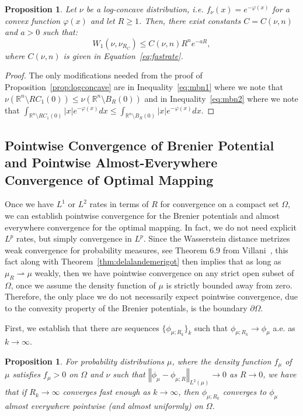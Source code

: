 \documentclass{amsart}
\theoremstyle{lemma}
\newtheorem{proposition}[theorem]{Proposition}
\theoremstyle{remark}
\begin{document}
\begin{proposition}
Let $\nu$ be a log-concave distribution, i.e. $f_{\nu}(x) = e^{-\varphi(x)}$ for a convex function $\varphi(x)$ and let $R \geq 1$. Then, there exist constants $C = C(\nu, n)$ and $a>0$ such that:
\begin{equation}
W_1(\nu, \nu_{R_{C}}) \leq C(\nu, n) R^n e^{-aR},
\end{equation}
where $C(\nu, n)$ is given in Equation~\eqref{eq:fastrate}.
\end{proposition}
\begin{proof}
The only modifications needed from the proof of Proposition~\ref{prop:logconcave} are in Inequality~\eqref{eq:mbn1} where we note that $\nu(\mathbb{R}^n \setminus RC_1(0)) \leq \nu(\mathbb{R}^n \setminus B_{R}(0))$ and in Inequality~\eqref{eq:mbn2} where we note that $\int_{\mathbb{R}^n \setminus RC_1(0)} \vert x \vert e^{-\varphi(x)}dx \leq \int_{\mathbb{R}^n \setminus B_{R}(0)} \vert x \vert e^{-\varphi(x)}dx$. 
\end{proof}

\subsection{Pointwise Convergence of Brenier Potential and Pointwise Almost-Everywhere Convergence of Optimal Mapping}\label{sec:pointwise}

Once we have $L^1$ or $L^2$ rates in terms of $R$ for convergence on a compact set $\Omega$, we can establish pointwise convergence for the Brenier potentials and almost everywhere convergence for the optimal mapping. In fact, we do not need explicit $L^p$ rates, but simply convergence in $L^p$. Since the Wasserstein distance metrizes weak convergence for probability measures, see Theorem 6.9 from Villani~\cite{villani2}, this fact along with Theorem~\ref{thm:delalandemerigot} then implies that as long as $\mu_{R} \rightharpoonup \mu$ weakly, then we have pointwise convergence on any strict open subset of $\Omega$, once we assume the density function of $\mu$ is strictly bounded away from zero. Therefore, the only place we do not necessarily expect pointwise convergence, due to the convexity property of the Brenier potentials, is the boundary $\partial \Omega$.

First, we establish that there are sequences $\{\phi_{\mu;R_{k}} \}_{k}$ such that $\phi_{\mu;R_{k}} \rightarrow \phi_{\mu}$ a.e. as $k \rightarrow \infty$.

\begin{proposition}\label{prop:almosteverywhere}
For probability distributions $\mu$, where the density function $f_{\mu}$ of $\mu$ satisfies $f_{\mu}>0$ on $\Omega$ and $\nu$ such that $\left\Vert \phi_{\mu}- \phi_{\mu;R} \right\Vert_{L^2(\mu)} \rightarrow 0$ as $R \rightarrow 0$, we have that if $R_{k} \rightarrow \infty$ converges fast enough as $k \rightarrow \infty$, then $\phi_{\mu;R_{k}}$ converges to $\phi_{\mu}$ almost everywhere pointwise (and almost uniformly) on $\Omega$.
\end{proposition}
\end{document}

